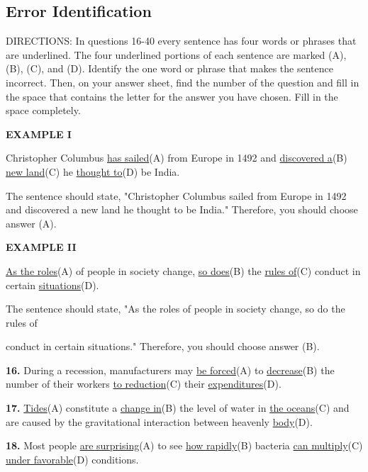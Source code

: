 \documentclass[12pt]{article}
\begin{document}
\subsection*{Error Identification}
DIRECTIONS: In questions 16-40 every sentence has four words or phrases that are underlined. The four underlined portions of each sentence are marked (A), (B), (C), and (D). Identify the one word or phrase that makes the sentence incorrect. Then, on your answer sheet, find the number of the question and fill in the space that contains the letter for the answer you have chosen. Fill in the space completely.\par
\begin{exampleblock}
\textbf{EXAMPLE I}\par
Christopher Columbus \uline{has sailed}(A) from Europe in 1492 and \uline{discovered a}(B) \uline{new land}(C) he \uline{thought to}(D) be India.\par
The sentence should state, "Christopher Columbus sailed from Europe in 1492 and discovered a new land he thought to be India." Therefore, you should choose answer (A).\par
\end{exampleblock}
\begin{exampleblock}
\textbf{EXAMPLE II}\par
\uline{As the roles}(A) of people in society change, \uline{so does}(B) the \uline{rules of}(C) conduct in certain \uline{situations}(D).\par
The sentence should state, "As the roles of people in society change, so do the rules of\par
conduct in certain situations." Therefore, you should choose answer (B).\par
\end{exampleblock}
\noindent\textbf{16.} During a recession, manufacturers may \uline{be forced}(A) to \uline{decrease}(B) the number of their workers \uline{to reduction}(C) their \uline{expenditures}(D).
\par
\vspace{\questionblockgap}
\noindent\textbf{17.} \uline{Tides}(A) constitute a \uline{change in}(B) the level of water in \uline{the oceans}(C) and are caused by the gravitational interaction between heavenly \uline{body}(D).
\par
\vspace{\questionblockgap}
\noindent\textbf{18.} Most people \uline{are surprising}(A) to see \uline{how rapidly}(B) bacteria \uline{can multiply}(C) \uline{under favorable}(D) conditions.
\end{document}
